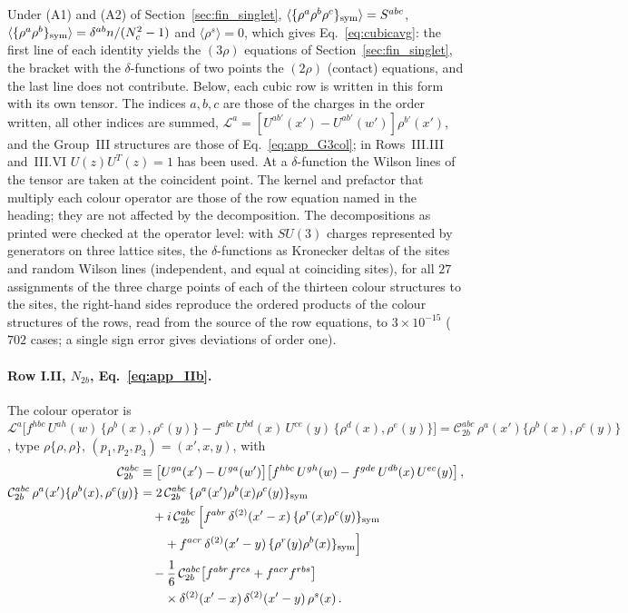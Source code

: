 Under (A1) and (A2) of Section~\ref{sec:fin_singlet}, $\langle\{\rho^a\rho^b\rho^c\}_{\rm sym}\rangle=S^{abc}$, $\langle\{\rho^a\rho^b\}_{\rm sym}\rangle=\delta^{ab}n/(N_c^2-1)$ and $\langle\rho^s\rangle=0$, which gives Eq.~\eqref{eq:cubicavg}: the first line of each identity yields the $(3\rho)$ equations of Section~\ref{sec:fin_singlet}, the bracket with the $\delta$-functions of two points the $(2\rho)$ (contact) equations, and the last line does not contribute. Below, each cubic row is written in this form with its own tensor. The indices $a,b,c$ are those of the charges in the order written, all other indices are summed, $\mathcal L^a=[U^{ab'}(x')-U^{ab'}(w')]\rho^{b'}(x')$, and the Group~III structures are those of Eq.~\eqref{eq:app_G3col}; in Rows~III.III and~III.VI $U(z)U^T(z)=1$ has been used. At a $\delta$-function the Wilson lines of the tensor are taken at the coincident point. The kernel and prefactor that multiply each colour operator are those of the row equation named in the heading; they are not affected by the decomposition. The decompositions as printed were checked at the operator level: with $SU(3)$ charges represented by generators on three lattice sites, the $\delta$-functions as Kronecker deltas of the sites and random Wilson lines (independent, and equal at coinciding sites), for all $27$ assignments of the three charge points of each of the thirteen colour structures to the sites, the right-hand sides reproduce the ordered products of the colour structures of the rows, read from the source of the row equations, to $3\times10^{-15}$ ($702$ cases; a single sign error gives deviations of order one).

\paragraph{Row I.II, $N_{2b}$, Eq.~\eqref{eq:app_IIb}.} The colour operator is $\mathcal L^a\big[f^{hbc}\,U^{ah}(w)\,\{\rho^b(x),\rho^c(y)\}-f^{abc}\,U^{bd}(x)\,U^{ce}(y)\,\{\rho^d(x),\rho^e(y)\}\big]=\mathcal C^{abc}_{2b}\,\rho^a(x')\{\rho^b(x),\rho^c(y)\}$, type $\rho\{\rho,\rho\}$, $(p_1,p_2,p_3)=(x',x,y)$, with
\begin{align}
\mathcal C^{abc}_{2b}&\equiv \big[U^{ga}(x')-U^{ga}(w')\big]\big[f^{hbc}\,U^{gh}(w)-f^{gde}\,U^{db}(x)\,U^{ec}(y)\big]\,,\notag\\
\mathcal C^{abc}_{2b}\,\rho^a(x')\{\rho^b(x),\rho^c(y)\}
&=2\,\mathcal C^{abc}_{2b}\,\{\rho^a(x')\rho^b(x)\rho^c(y)\}_{\rm sym}\notag\\
&\quad+i\,\mathcal C^{abc}_{2b}\,\Big[f^{abr}\,\delta^{(2)}(x'-x)\,\{\rho^{r}(x)\rho^{c}(y)\}_{\rm sym}\notag\\
&\qquad+f^{acr}\,\delta^{(2)}(x'-y)\,\{\rho^{r}(y)\rho^{b}(x)\}_{\rm sym}\Big]\notag\\
&\quad-\frac16\,\mathcal C^{abc}_{2b}\big[f^{abr}f^{rcs}+f^{acr}f^{rbs}\big]\notag\\
&\qquad\times\delta^{(2)}(x'-x)\,\delta^{(2)}(x'-y)\,\rho^s(x)\,.\label{eq:app_sym_IIb}
\end{align}
